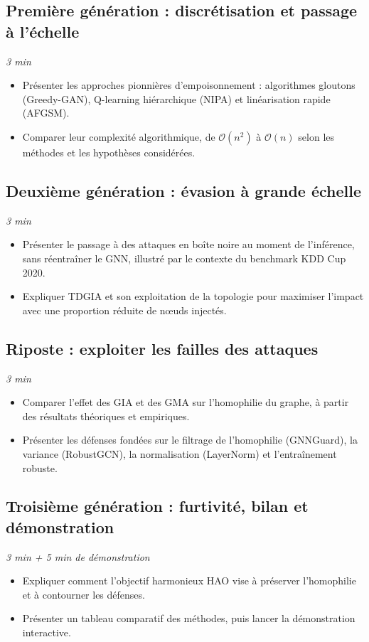 \documentclass[11pt,a4paper]{article}
\newcommand{\duree}[1]{\hfill\textit{#1}}
\begin{document}
\subsection{Première génération : discrétisation et passage à l'échelle}\duree{3 min}
\begin{itemize}
    \item Présenter les approches pionnières d'empoisonnement : algorithmes
    gloutons (Greedy-GAN), Q-learning hiérarchique (NIPA) et linéarisation
    rapide (AFGSM).
    \item Comparer leur complexité algorithmique, de $\mathcal{O}(n^2)$ à
    $\mathcal{O}(n)$ selon les méthodes et les hypothèses considérées.
\end{itemize}

\subsection{Deuxième génération : évasion à grande échelle}\duree{3 min}
\begin{itemize}
    \item Présenter le passage à des attaques en boîte noire au moment de
    l'inférence, sans réentraîner le GNN, illustré par le contexte du benchmark
    KDD Cup 2020.
    \item Expliquer TDGIA et son exploitation de la topologie pour maximiser
    l'impact avec une proportion réduite de nœuds injectés.
\end{itemize}

\subsection{Riposte : exploiter les failles des attaques}\duree{3 min}
\begin{itemize}
    \item Comparer l'effet des GIA et des GMA sur l'homophilie du graphe, à
    partir des résultats théoriques et empiriques.
    \item Présenter les défenses fondées sur le filtrage de l'homophilie
    (GNNGuard), la variance (RobustGCN), la normalisation (LayerNorm) et
    l'entraînement robuste.
\end{itemize}

\subsection{Troisième génération : furtivité, bilan et démonstration}\duree{3 min + 5 min de démonstration}
\begin{itemize}
    \item Expliquer comment l'objectif harmonieux HAO vise à préserver
    l'homophilie et à contourner les défenses.
    \item Présenter un tableau comparatif des méthodes, puis lancer la
    démonstration interactive.
\end{itemize}
\end{document}
